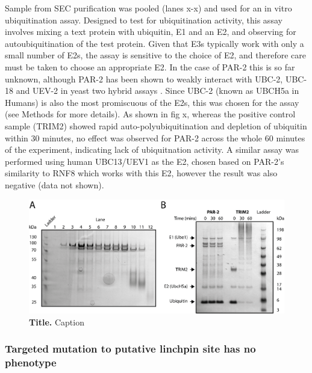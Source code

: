 \documentclass[12pt]{"article"}
\newcommand{\mycaption}[2]{\caption[#1]{\textbf{#1.} #2}}
\begin{document}
Sample from SEC purification was pooled (lanes x-x) and used for an in vitro ubiquitination assay. Designed to test for ubiquitination activity, this assay involves mixing a text protein with ubiquitin, E1 and an E2, and observing for autoubiquitination of the test protein. Given that E3s typically work with only a small number of E2s, the assay is sensitive to the choice of E2, and therefore care must be taken to choose an appropriate E2. In the case of PAR-2 this is so far unknown, although PAR-2 has been shown to weakly interact with UBC-2, UBC-18 and UEV-2 in yeast two hybrid assays \citep{Gudgen2004}. Since UBC-2 (known as UBCH5a in Humans) is also the most promiscuous of the E2s, this was chosen for the assay (see Methods for more details). As shown in fig x, whereas the positive control sample (TRIM2) showed rapid auto-polyubiquitination and depletion of ubiquitin within 30 minutes, no effect was observed for PAR-2 across the whole 60 minutes of the experiment, indicating lack of ubiquitnation activity. A similar assay was performed using human UBC13/UEV1 as the E2, chosen based on PAR-2's similarity to RNF8 which works with this E2, however the result was also negative (data not shown).\\

\begin{figure}[!h]
\includegraphics[scale=1]{ubiquitin_assay}
\setlength{\abovecaptionskip}{20pt}
\centering
\mycaption{Title}{Caption}
\label{ubiquitin_assay}
\end{figure}


\clearpage
\subsubsection{Targeted mutation to putative linchpin site has no phenotype}
\end{document}
